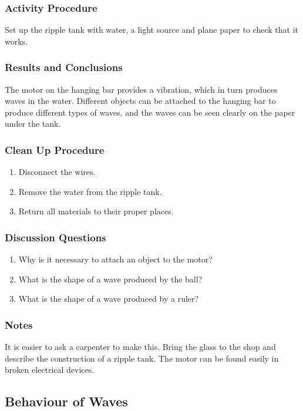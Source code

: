 \subsubsection*{Activity Procedure}
Set up the ripple tank with water, a light source and plane paper to check that it works.

\subsubsection*{Results and Conclusions}
The motor on the hanging bar provides a vibration, which in turn produces waves in the water.  Different objects can be attached to the hanging bar to produce different types of waves, and the waves can be seen clearly on the paper under the tank. 

\subsubsection*{Clean Up Procedure}
\begin{enumerate}
\item{Disconnect the wires.} 
\item{Remove the water from the ripple tank.} 
\item{Return all materials to their proper places.} 
\end{enumerate}

\subsubsection*{Discussion Questions}
\begin{enumerate}
\item{Why is it necessary to attach an object to the motor?}
\item{What is the shape of a wave produced by the ball?}
\item{What is the shape of a wave produced by a ruler?}
\end{enumerate}

\subsubsection*{Notes}
It is easier to ask a carpenter to make this. Bring the glass to the shop and describe the construction of a ripple tank. The motor can be found easily in broken electrical devices.  


	
\subsection{Behaviour of Waves}

